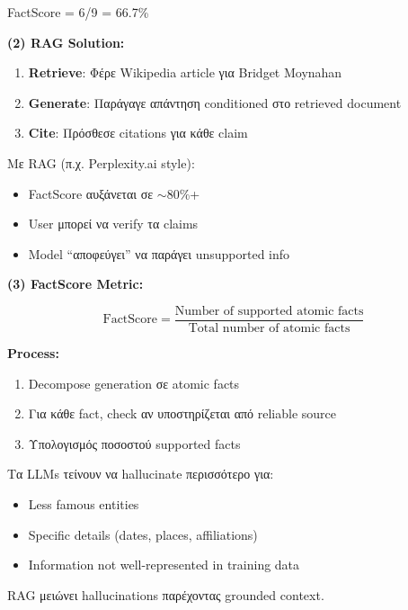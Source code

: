FactScore = 6/9 = 66.7\%

\textbf{(2) RAG Solution:}

\begin{enumerate}
    \item \textbf{Retrieve}: Φέρε Wikipedia article για Bridget Moynahan
    \item \textbf{Generate}: Παράγαγε απάντηση conditioned στο retrieved document
    \item \textbf{Cite}: Πρόσθεσε citations για κάθε claim
\end{enumerate}

Με RAG (π.χ. Perplexity.ai style):
\begin{itemize}
    \item FactScore αυξάνεται σε $\sim$80\%+
    \item User μπορεί να verify τα claims
    \item Model ``αποφεύγει'' να παράγει unsupported info
\end{itemize}

\textbf{(3) FactScore Metric:}

$$\text{FactScore} = \frac{\text{Number of supported atomic facts}}{\text{Total number of atomic facts}}$$

\textbf{Process:}
\begin{enumerate}
    \item Decompose generation σε atomic facts
    \item Για κάθε fact, check αν υποστηρίζεται από reliable source
    \item Υπολογισμός ποσοστού supported facts
\end{enumerate}

\begin{warningbox}
Τα LLMs τείνουν να hallucinate περισσότερο για:
\begin{itemize}
    \item Less famous entities
    \item Specific details (dates, places, affiliations)
    \item Information not well-represented in training data
\end{itemize}
RAG μειώνει hallucinations παρέχοντας grounded context.
\end{warningbox}
